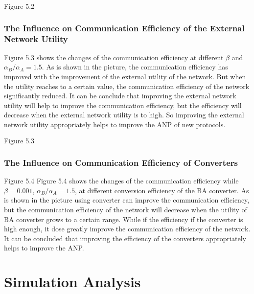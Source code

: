 \documentclass{article}
\begin{document}
Figure 5.2
\subsubsection{The Influence on Communication Efficiency of the External Network Utility}
Figure 5.3 shows the changes of the communication efficiency at different $\beta$ and $\alpha_{B}/\alpha_{A}=1.5$. As is
shown in the picture, the communication efficiency has improved with the improvement of the external utility of the network.
But when the utility reaches to a certain value, the communication efficiency of the network significantly reduced. It
can be conclude that improving the external network utility will help to improve the communication efficiency, but the
efficiency will decrease when the external network utility is to high. So improving the external network utility
appropriately helps to improve the ANP of new protocols.

Figure 5.3
\subsubsection{The Influence on Communication Efficiency of Converters}

Figure 5.4
Figure 5.4 shows the changes of the communication efficiency while $\beta= 0.001$, $\alpha_B/\alpha_A=1.5$, at different
conversion efficiency of the BA converter. As is shown in the picture using converter can improve the communication efficiency,
but the communication efficiency of the network will decrease when the utility of BA converter grows to a certain range.
While if the efficiency if the converter is high enough, it dose greatly improve the communication efficiency of the network.
It can be concluded that improving the efficiency of the converters appropriately helps to improve the ANP.

\section{Simulation Analysis}
\end{document}
